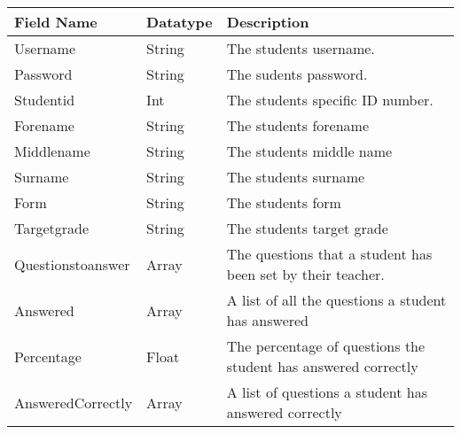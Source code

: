\documentclass[letterpaper]{article}
\title{}
\author{}
\date{2015-03-31}
\begin{document}
\begin{center}
\tablefirsthead{}
\tablehead{}
\tabletail{}
\tablelasttail{}
\begin{supertabular}{|m{1.6525599in}|m{1.6525599in}|m{3.38376in}|}
\hline
Field Name &
Datatype &
Description\\\hline
Username &
String &
The students username.\\\hline
Password &
String &
The sudents password.\\\hline
Studentid &
Int &
The students specific ID number.\\\hline
Forename &
String &
The students forename\\\hline
Middlename &
String &
The students middle name\\\hline
Surname &
String &
The students surname \\\hline
Form &
String &
The students form \\\hline
Targetgrade &
String &
The students target grade\\\hline
Questionstoanswer &
Array &
The questions that a student has been set by their teacher.\\\hline
Answered &
Array &
A list of all the questions a student has answered\\\hline
Percentage &
Float &
The percentage of questions the student has answered correctly\\\hline
AnsweredCorrectly &
Array &
A list of questions a student has answered correctly\\\hline
\end{supertabular}
\end{center}

\bigskip


\bigskip


\bigskip


\bigskip
\end{document}
